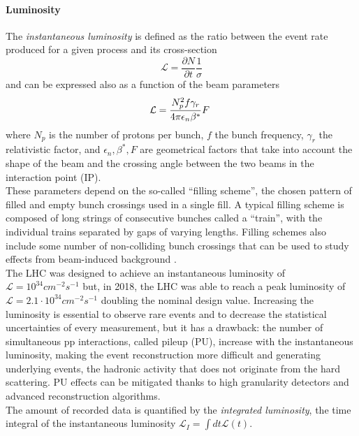 \paragraph*{Luminosity}
The \emph{instantaneous luminosity} is defined as the ratio between the event rate produced for a given process and its cross-section
\begin{equation}
    \mathcal{L} = \frac{\partial N}{\partial t} \frac{1}{\sigma} 
\end{equation}
and can be expressed also as a function of the beam parameters
\begin{equation}
    \mathcal{L}=\frac{N_{p}^{2}f\gamma_{r}}{4\pi\epsilon_{n}\beta\sp{\ast}}F\ 
\end{equation}
where $N_p$ is the number of protons per bunch, $f$ the bunch frequency, $\gamma_r$ the relativistic factor, and $\epsilon_n, \beta^*, F$ are geometrical factors that take into account the shape of the beam and the crossing angle between the two beams in the interaction point (IP).\\
These parameters depend on the so-called “filling scheme”, the chosen pattern of filled and empty bunch crossings used in a single fill.
A typical filling scheme is composed of long strings of consecutive bunches called a “train”, with the individual trains separated by gaps of varying lengths. Filling schemes also include some number of non-colliding bunch crossings that can be used to study effects from beam-induced background \cite{CMSCollaboration2021PrecisionCMS}.\\
The LHC was designed to achieve an instantaneous luminosity of $\mathcal{L}=10^{34} cm^{-2}s^{-1}$ but, in 2018, the LHC was able to reach a peak luminosity of $\mathcal{L}=2.1 \cdot 10^{34} cm^{-2}s^{-1}$ doubling the nominal design value. Increasing the luminosity is essential to observe rare events and to decrease the statistical uncertainties of every measurement, but it has a drawback: the number of simultaneous pp interactions, called pileup (PU), increase with the instantaneous luminosity, making the event reconstruction more difficult and generating underlying events, \ie the hadronic activity that does not originate from the hard scattering. PU effects can be mitigated thanks to high granularity detectors and advanced reconstruction algorithms.\\
The amount of recorded data is quantified by the \emph{integrated luminosity}, the time integral of the instantaneous luminosity $\mathcal{L}_I=\int dt \mathcal{L}(t)$.


